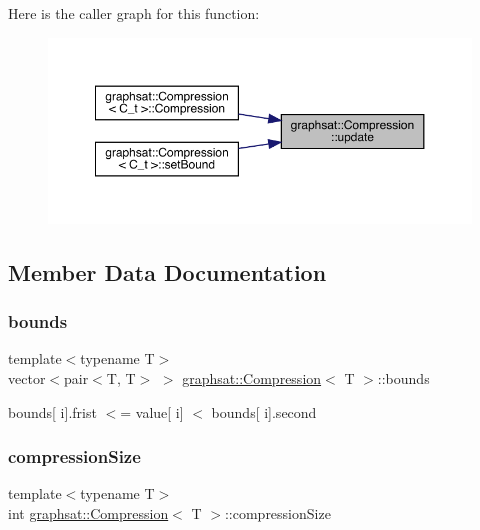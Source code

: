 Here is the caller graph for this function\+:
\nopagebreak
\begin{figure}[H]
\begin{center}
\leavevmode
\includegraphics[width=350pt]{classgraphsat_1_1_compression_aaf2178a46a2874f7c91b59587f199ecf_icgraph}
\end{center}
\end{figure}


\subsection{Member Data Documentation}
\mbox{\label{classgraphsat_1_1_compression_a3c87e36e0cd103f8a22cbffbaa6fd2fd}} 
\subsubsection{\texorpdfstring{bounds}{bounds}}
{\footnotesize\ttfamily template$<$typename T$>$ \\
vector$<$pair$<$T, T$>$ $>$ \mbox{\hyperlink{classgraphsat_1_1_compression}{graphsat\+::\+Compression}}$<$ T $>$\+::bounds\hspace{0.3cm}{\ttfamily [private]}}

bounds\mbox{[} i\mbox{]}.frist $<$= value\mbox{[} i\mbox{]} $<$ bounds\mbox{[} i\mbox{]}.second \mbox{\label{classgraphsat_1_1_compression_aca1c781ad7505b1d19829fcba69b42fb}} 
\subsubsection{\texorpdfstring{compressionSize}{compressionSize}}
{\footnotesize\ttfamily template$<$typename T$>$ \\
int \mbox{\hyperlink{classgraphsat_1_1_compression}{graphsat\+::\+Compression}}$<$ T $>$\+::compression\+Size\hspace{0.3cm}{\ttfamily [private]}}

